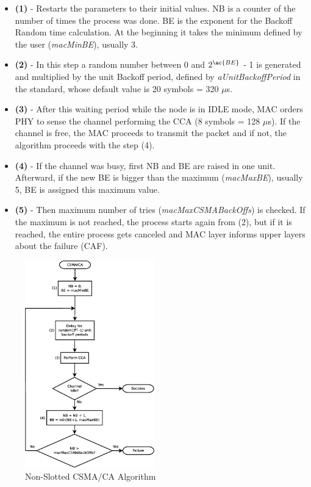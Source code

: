 \begin{itemize}
 \item \textbf{(1)} - Restarts the parameters to their initial values. \ac{NB} is a counter of the number of times the process was done. \ac{BE}
is the exponent for the Backoff Random time calculation. At the beginning it takes the minimum defined by the user (\textit{macMinBE}), usually 3.
 \item \textbf{(2)} - In this step a random number between 0 and $2^{\ac{BE}}$ - 1 is generated and multiplied by the unit Backoff period, defined
by \textit{aUnitBackoffPeriod} in the standard, whose default value is 20 symbols = 320 $\mu$s.
 \item \textbf{(3)} - After this waiting period while the node is in IDLE mode, \ac{MAC} orders \ac{PHY} to sense the channel performing the \ac{CCA} 
(8 symbols = 128 $\mu$s). If the channel is free, the \ac{MAC} proceeds to transmit the packet and if not, the algorithm proceeds with the 
step (4).
 \item \textbf{(4)} - If the channel was busy, first \ac{NB} and \ac{BE} are raised in one unit. Afterward, if the new \ac{BE} is bigger than the maximum
(\textit{macMaxBE}), usually 5, \ac{BE} is assigned this maximum value.
 \item \textbf{(5)} - Then maximum number of tries (\textit{macMaxCSMABackOffs}) is checked. If the maximum is not reached, the process starts again from (2),
but if it is reached, the entire process gets canceled and \ac{MAC} layer informs upper layers about the failure (\ac{CAF}).
\end{itemize}

\begin{figure}[!ht]
 \begin{center}
  \includegraphics[width=0.5\textwidth]{CSMACA.eps}
 \end{center}
 \caption{Non-Slotted \ac{CSMA/CA} Algorithm \cite{IEEE802.15.4-2006}}
 \label{fig:CSMACA}
\end{figure}

